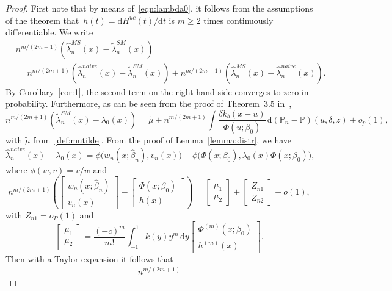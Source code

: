 \documentclass[11pt,reqno]{amsart}
\theoremstyle{definition}
\theoremstyle{plain}
\theoremstyle{remark}
\begin{document}
\begin{proof}
First note that by means of~\eqref{eqn:lambda0}, it follows from the assumptions of the theorem that~$h(t)=\mathrm{d}H^{uc}(t)/\mathrm{d}t$ is $m\geq 2$ times
continuously differentiable.
We write
\[
\begin{split}
&
n^{m/(2m+1)}
\left(
\hat{\lambda}_n^{MS}(x)-\tilde{\lambda}_n^{SM}(x)
\right)\\
&=
n^{m/(2m+1)}
\left(
\hat{\lambda}_n^{naive}(x)-\tilde{\lambda}_n^{SM}(x)
\right)
+
n^{m/(2m+1)}
\left(
\hat{\lambda}_n^{MS}(x)-\hat{\lambda}_n^{naive}(x)
\right).
\end{split}
\]
By Corollary~\ref{cor:1}, the second term on the right hand side converges to zero in probability.
Furthermore, as can be seen from the proof of Theorem~3.5 in~\cite{LopuhaaMustaSI2016},
\[
n^{m/(2m+1)}
\left(
\tilde{\lambda}^{SM}_n(x)-\lambda_0(x)
\right)
=
\widetilde{\mu}
+
n^{m/(2m+1)}
\int
\frac{\delta k_b(x-u)}{\Phi(u;\beta_0)}\,\mathrm{d}({\mathbb{P}}_n-{\mathbb{P}})(u,\delta,z)+o_p(1),
\]
with $\widetilde{\mu}$ from~\eqref{def:mutilde}.
From the proof of Lemma~\ref{lemma:distr}, we have
\[
\hat{\lambda}_n^{naive}(x)-\lambda_0(x)
=
\phi\Big(w_n(x;\hat\beta_n),v_n(x)\Big)
-
\phi\Big(\Phi(x;\beta_0),\lambda_0(x)\Phi(x;\beta_0)\Big),
\]
where $\phi(w,v)=v/w$ and
\[
n^{m/(2m+1)}
\left(
\begin{bmatrix}
w_n(x;\hat\beta_n)\\
v_n(x)
\end{bmatrix}
-
\begin{bmatrix}
\Phi(x;\beta_0)\\
h(x)
\end{bmatrix}
\right)
=
\begin{bmatrix}
\mu_1\\
\mu_2
\end{bmatrix}
+
\begin{bmatrix}
Z_{n1}\\
Z_{n2}
\end{bmatrix}
+
o(1),
\]
with $Z_{n1}=o_P(1)$ and
\[
\begin{bmatrix}
\mu_1\\
\mu_2
\end{bmatrix}
=
\frac{(-c)^m}{m!}\int_{-1}^1 k(y)y^m\,\mathrm{d}y
\begin{bmatrix}
\Phi^{(m)}(x;\beta_0)\\
h^{(m)}(x)
\end{bmatrix}.
\]
Then with a Taylor expansion it follows that
\[
\begin{split}
n^{m/(2m+1)}

\end{split}\]
\end{proof}
\end{document}
